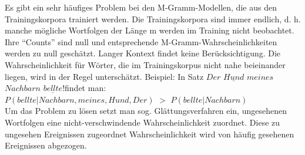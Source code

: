 Es gibt ein sehr h\"aufiges Problem bei den M-Gramm-Modellen, die aus den Trainingskorpora trainiert werden. Die Trainingskorpora sind immer endlich, d. h.  manche m\"ogliche Wortfolgen der L\"ange m werden im Training nicht beobachtet. Ihre "`Counts"' sind null und entsprechende M-Gramm-Wahrscheinlichkeiten werden zu null gesch\"atzt. Langer Kontext findet keine Ber\"ucksichtigung. Die Wahrscheinlichkeit f\"ur W\"orter, die im Trainingskorpus nicht nahe beieinander liegen, wird in der Regel untersch\"atzt. Beispiel: In Satz  \glqq $Der$ $\underline{Hund}$  $meines$ $Nachbarn$  $\underline{bellte}!$\grqq \space findet man:\\ $P(bellte|Nachbarn, meines, Hund,Der)$ $>$ $P(bellte|Nachbarn)$\\
Um das Problem zu l\"osen setzt man sog. Gl\"attungsverfahren ein, ungesehenen Wortfolgen eine nicht-verschwindende Wahrscheinlichkeit zuordnet. Diese zu ungesehen Ereignissen zugeordnet Wahrscheinlichkeit wird von h\"aufig gesehenen Ereignissen abgezogen.
